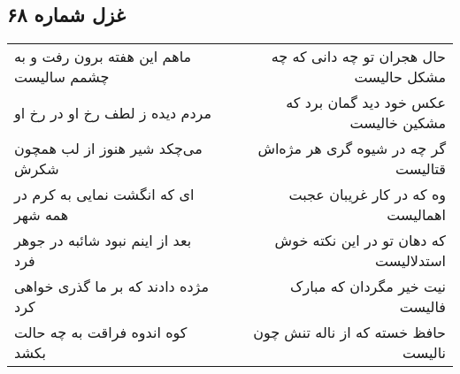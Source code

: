 \begin{center}
\section*{غزل شماره ۶۸}
\label{sec:sh068}
\begin{longtable}{l p{0.5cm} r}
ماهم این هفته برون رفت و به چشمم سالیست
&&
حال هجران تو چه دانی که چه مشکل حالیست
\\
مردم دیده ز لطف رخ او در رخ او
&&
عکس خود دید گمان برد که مشکین خالیست
\\
می‌چکد شیر هنوز از لب همچون شکرش
&&
گر چه در شیوه گری هر مژه‌اش قتالیست
\\
ای که انگشت نمایی به کرم در همه شهر
&&
وه که در کار غریبان عجبت اهمالیست
\\
بعد از اینم نبود شائبه در جوهر فرد
&&
که دهان تو در این نکته خوش استدلالیست
\\
مژده دادند که بر ما گذری خواهی کرد
&&
نیت خیر مگردان که مبارک فالیست
\\
کوه اندوه فراقت به چه حالت بکشد
&&
حافظ خسته که از ناله تنش چون نالیست
\\
\end{longtable}
\end{center}
